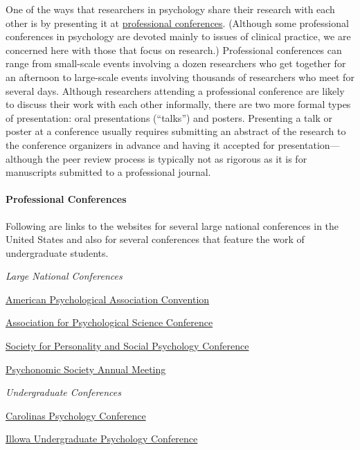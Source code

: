 \documentclass[
]{krantz}
\begin{document}
One of the ways that researchers in psychology share their research with each other is by presenting it at \hyperref[professional-conference]{professional conferences}. (Although some professional conferences in psychology are devoted mainly to issues of clinical practice, we are concerned here with those that focus on research.) Professional conferences can range from small-scale events involving a dozen researchers who get together for an afternoon to large-scale events involving thousands of researchers who meet for several days. Although researchers attending a professional conference are likely to discuss their work with each other informally, there are two more formal types of presentation: oral presentations (``talks'') and posters. Presenting a talk or poster at a conference usually requires submitting an abstract of the research to the conference organizers in advance and having it accepted for presentation---although the peer review process is typically not as rigorous as it is for manuscripts submitted to a professional journal.

\paragraph*{Professional Conferences}\label{professional-conferences}

Following are links to the websites for several large national conferences in the United States and also for several conferences that feature the work of undergraduate students.

\emph{Large National Conferences}

\href{https://convention.apa.org/}{American Psychological Association Convention}

\href{https://www.psychologicalscience.org/conventions}{Association for Psychological Science Conference}

\href{https://spsp.org/events/annual-convention}{Society for Personality and Social Psychology Conference}

\href{https://www.psychonomic.org/page/meetings}{Psychonomic Society Annual Meeting}

\emph{Undergraduate Conferences}

\href{https://education.campbell.edu/psychology/carolinas-psychology-conference/}{Carolinas Psychology Conference}

\href{http://research.monm.edu/illowa/}{Illowa Undergraduate Psychology Conference}
\end{document}
